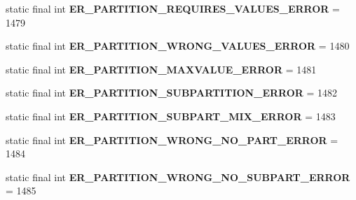 \begin{DoxyCompactItemize}
\item 
\mbox{\label{classcom_1_1mysql_1_1jdbc_1_1_mysql_error_numbers_afa6626e49efcebddac465a77a547cc26}} 
static final int {\bfseries E\+R\+\_\+\+P\+A\+R\+T\+I\+T\+I\+O\+N\+\_\+\+R\+E\+Q\+U\+I\+R\+E\+S\+\_\+\+V\+A\+L\+U\+E\+S\+\_\+\+E\+R\+R\+OR} = 1479
\item 
\mbox{\label{classcom_1_1mysql_1_1jdbc_1_1_mysql_error_numbers_afe9d2451ff76d4ecee8857e28640afe7}} 
static final int {\bfseries E\+R\+\_\+\+P\+A\+R\+T\+I\+T\+I\+O\+N\+\_\+\+W\+R\+O\+N\+G\+\_\+\+V\+A\+L\+U\+E\+S\+\_\+\+E\+R\+R\+OR} = 1480
\item 
\mbox{\label{classcom_1_1mysql_1_1jdbc_1_1_mysql_error_numbers_a848b819c9cea5c8e0a1269a91662ed23}} 
static final int {\bfseries E\+R\+\_\+\+P\+A\+R\+T\+I\+T\+I\+O\+N\+\_\+\+M\+A\+X\+V\+A\+L\+U\+E\+\_\+\+E\+R\+R\+OR} = 1481
\item 
\mbox{\label{classcom_1_1mysql_1_1jdbc_1_1_mysql_error_numbers_a28b1419427af708845caadbe83128840}} 
static final int {\bfseries E\+R\+\_\+\+P\+A\+R\+T\+I\+T\+I\+O\+N\+\_\+\+S\+U\+B\+P\+A\+R\+T\+I\+T\+I\+O\+N\+\_\+\+E\+R\+R\+OR} = 1482
\item 
\mbox{\label{classcom_1_1mysql_1_1jdbc_1_1_mysql_error_numbers_a6b908d66e3afe394cdad1ac745abadf6}} 
static final int {\bfseries E\+R\+\_\+\+P\+A\+R\+T\+I\+T\+I\+O\+N\+\_\+\+S\+U\+B\+P\+A\+R\+T\+\_\+\+M\+I\+X\+\_\+\+E\+R\+R\+OR} = 1483
\item 
\mbox{\label{classcom_1_1mysql_1_1jdbc_1_1_mysql_error_numbers_a369642ab74b5daf4c1957288add31ab8}} 
static final int {\bfseries E\+R\+\_\+\+P\+A\+R\+T\+I\+T\+I\+O\+N\+\_\+\+W\+R\+O\+N\+G\+\_\+\+N\+O\+\_\+\+P\+A\+R\+T\+\_\+\+E\+R\+R\+OR} = 1484
\item 
\mbox{\label{classcom_1_1mysql_1_1jdbc_1_1_mysql_error_numbers_a731532a199a4b3cb501ae07258573899}} 
static final int {\bfseries E\+R\+\_\+\+P\+A\+R\+T\+I\+T\+I\+O\+N\+\_\+\+W\+R\+O\+N\+G\+\_\+\+N\+O\+\_\+\+S\+U\+B\+P\+A\+R\+T\+\_\+\+E\+R\+R\+OR} = 1485

\end{DoxyCompactItemize}
